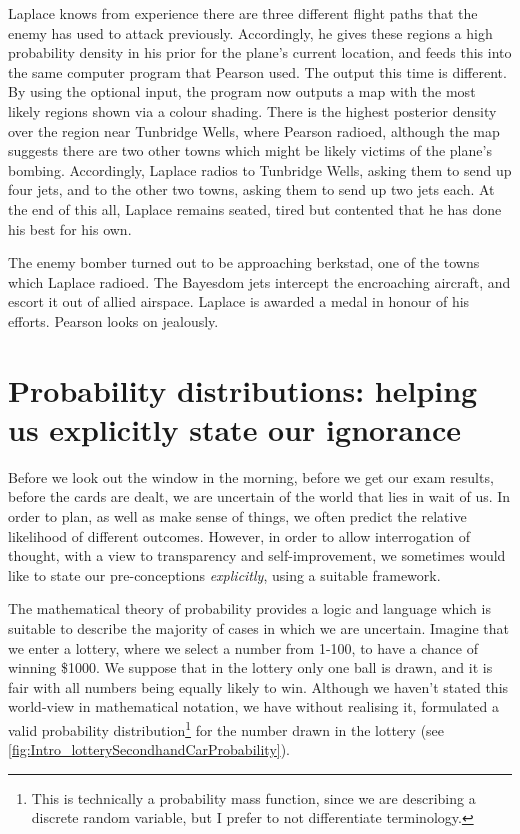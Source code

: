 \documentclass[11pt,fullpage]{book}
\begin{document}
Laplace knows from experience there are three different flight paths that the enemy has used to attack previously. Accordingly, he gives these regions a high probability density in his prior for the plane's current location, and feeds this into the same computer program that Pearson used. The output this time is different. By using the optional input, the program now outputs a map with the most likely regions shown via a colour shading. There is the highest posterior density over the region near Tunbridge Wells, where Pearson radioed, although the map suggests there are two other towns which might be likely victims of the plane's bombing. Accordingly, Laplace radios to Tunbridge Wells, asking them to send up four jets, and to the other two towns, asking them to send up two jets each. At the end of this all, Laplace remains seated, tired but contented that he has done his best for his own.

The enemy bomber turned out to be approaching berkstad, one of the towns which Laplace radioed. The Bayesdom jets intercept the encroaching aircraft, and escort it out of allied airspace. Laplace is awarded a medal in honour of his efforts. Pearson looks on jealously.

\section{Probability distributions: helping us explicitly state our ignorance}\label{sec:Intro_probabilityDistributions}
Before we look out the window in the morning, before we get our exam results, before the cards are dealt, we are uncertain of the world that lies in wait of us. In order to plan, as well as make sense of things, we often predict the relative likelihood of different outcomes. However, in order to allow interrogation of thought, with a view to transparency and self-improvement, we sometimes would like to state our pre-conceptions \textit{explicitly}, using a suitable framework. 

The mathematical theory of probability provides a logic and language which is suitable to describe the majority of cases in which we are uncertain. Imagine that we enter a lottery, where we select a number from 1-100, to have a chance of winning \$1000. We suppose that in the lottery only one ball is drawn, and it is fair with all numbers being equally likely to win. Although we haven't stated this world-view in mathematical notation, we have without realising it, formulated a valid probability distribution\footnote{This is technically a probability mass function, since we are describing a discrete random variable, but I prefer to not differentiate terminology.} for the number drawn in the lottery (see \ref{fig:Intro_lotterySecondhandCarProbability}).
\end{document}
